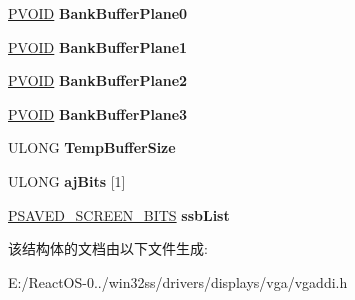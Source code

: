 \begin{DoxyCompactItemize}
\item 
\mbox{\label{struct___d_e_v_s_u_r_f_a68c07454ac27cda2bea8079d49a617f0}} 
\hyperlink{interfacevoid}{P\+V\+O\+ID} {\bfseries Bank\+Buffer\+Plane0}
\item 
\mbox{\label{struct___d_e_v_s_u_r_f_a87ce49b6525fdc8e7c46a201a9a3bca6}} 
\hyperlink{interfacevoid}{P\+V\+O\+ID} {\bfseries Bank\+Buffer\+Plane1}
\item 
\mbox{\label{struct___d_e_v_s_u_r_f_a66f81f13c44e5e31ceb33cc9575c7191}} 
\hyperlink{interfacevoid}{P\+V\+O\+ID} {\bfseries Bank\+Buffer\+Plane2}
\item 
\mbox{\label{struct___d_e_v_s_u_r_f_a0c7598b80c90d9061efcc1996450c5cf}} 
\hyperlink{interfacevoid}{P\+V\+O\+ID} {\bfseries Bank\+Buffer\+Plane3}
\item 
\mbox{\label{struct___d_e_v_s_u_r_f_a0444f4b8937b1981d317f89880d0580a}} 
U\+L\+O\+NG {\bfseries Temp\+Buffer\+Size}
\item 
\mbox{\label{struct___d_e_v_s_u_r_f_ac6b49e244cff2b12a7953a950f11915a}} 
U\+L\+O\+NG {\bfseries aj\+Bits} \mbox{[}1\mbox{]}
\item 
\mbox{\label{struct___d_e_v_s_u_r_f_a70f0cda8309cf8b77df6ee5d856e195e}} 
\hyperlink{struct___s_a_v_e_d___s_c_r_e_e_n___b_i_t_s}{P\+S\+A\+V\+E\+D\+\_\+\+S\+C\+R\+E\+E\+N\+\_\+\+B\+I\+TS} {\bfseries ssb\+List}
\end{DoxyCompactItemize}


该结构体的文档由以下文件生成\+:\begin{DoxyCompactItemize}
\item 
E\+:/\+React\+O\+S-\/0../win32ss/drivers/displays/vga/vgaddi.\+h\end{DoxyCompactItemize}
